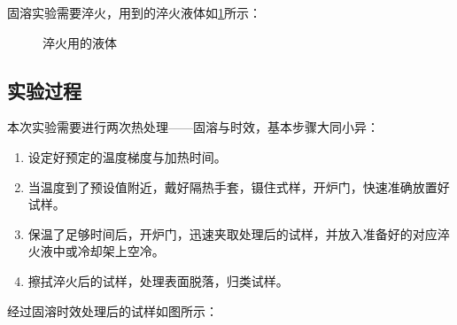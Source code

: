 固溶实验需要淬火，用到的淬火液体如\ref{fig:淬火用液体}所示：
\begin{figure}[h!]
	\centering
	\hspace{0.5in} %
	\caption{淬火用的液体}
	\label{fig:淬火用液体}
\end{figure}
\subsection{实验过程}
本次实验需要进行两次热处理——固溶与时效，基本步骤大同小异：
\begin{enumerate}
	\item 设定好预定的温度梯度与加热时间。
	\item 当温度到了预设值附近，戴好隔热手套，镊住式样，开炉门，快速准确放置好试样。
	\item 保温了足够时间后，开炉门，迅速夹取处理后的试样，并放入准备好的对应淬火液中或冷却架上空冷。
	\item 擦拭淬火后的试样，处理表面脱落，归类试样。
\end{enumerate}
经过固溶时效处理后的试样如图所示：




